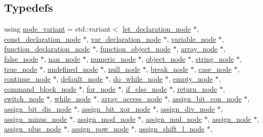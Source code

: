 \subsection*{Typedefs}
\begin{DoxyCompactItemize}
\item 
using \hyperlink{namespacejawe_aca98f97d61e437678e7478e2d8aaf41f}{node\+\_\+variant} = std\+::variant$<$ \hyperlink{classjawe_1_1let__declaration__node}{let\+\_\+declaration\+\_\+node} $\ast$, \hyperlink{classjawe_1_1const__declaration__node}{const\+\_\+declaration\+\_\+node} $\ast$, \hyperlink{classjawe_1_1var__declaration__node}{var\+\_\+declaration\+\_\+node} $\ast$, \hyperlink{classjawe_1_1variable__node}{variable\+\_\+node} $\ast$, \hyperlink{classjawe_1_1function__declaration__node}{function\+\_\+declaration\+\_\+node} $\ast$, \hyperlink{classjawe_1_1function__object__node}{function\+\_\+object\+\_\+node} $\ast$, \hyperlink{classjawe_1_1array__node}{array\+\_\+node} $\ast$, \hyperlink{classjawe_1_1false__node}{false\+\_\+node} $\ast$, \hyperlink{classjawe_1_1nan__node}{nan\+\_\+node} $\ast$, \hyperlink{classjawe_1_1numeric__node}{numeric\+\_\+node} $\ast$, \hyperlink{classjawe_1_1object__node}{object\+\_\+node} $\ast$, \hyperlink{classjawe_1_1string__node}{string\+\_\+node} $\ast$, \hyperlink{classjawe_1_1true__node}{true\+\_\+node} $\ast$, \hyperlink{classjawe_1_1undefined__node}{undefined\+\_\+node} $\ast$, \hyperlink{classjawe_1_1null__node}{null\+\_\+node} $\ast$, \hyperlink{classjawe_1_1break__node}{break\+\_\+node} $\ast$, \hyperlink{classjawe_1_1case__node}{case\+\_\+node} $\ast$, \hyperlink{classjawe_1_1continue__node}{continue\+\_\+node} $\ast$, \hyperlink{classjawe_1_1default__node}{default\+\_\+node} $\ast$, \hyperlink{classjawe_1_1do__while__node}{do\+\_\+while\+\_\+node} $\ast$, \hyperlink{classjawe_1_1empty__node}{empty\+\_\+node} $\ast$, \hyperlink{classjawe_1_1command__block__node}{command\+\_\+block\+\_\+node} $\ast$, \hyperlink{classjawe_1_1for__node}{for\+\_\+node} $\ast$, \hyperlink{classjawe_1_1if__else__node}{if\+\_\+else\+\_\+node} $\ast$, \hyperlink{classjawe_1_1return__node}{return\+\_\+node} $\ast$, \hyperlink{classjawe_1_1switch__node}{switch\+\_\+node} $\ast$, \hyperlink{classjawe_1_1while__node}{while\+\_\+node} $\ast$, \hyperlink{classjawe_1_1array__access__node}{array\+\_\+access\+\_\+node} $\ast$, \hyperlink{classjawe_1_1assign__bit__con__node}{assign\+\_\+bit\+\_\+con\+\_\+node} $\ast$, \hyperlink{classjawe_1_1assign__bit__dis__node}{assign\+\_\+bit\+\_\+dis\+\_\+node} $\ast$, \hyperlink{classjawe_1_1assign__bit__xor__node}{assign\+\_\+bit\+\_\+xor\+\_\+node} $\ast$, \hyperlink{classjawe_1_1assign__div__node}{assign\+\_\+div\+\_\+node} $\ast$, \hyperlink{classjawe_1_1assign__minus__node}{assign\+\_\+minus\+\_\+node} $\ast$, \hyperlink{classjawe_1_1assign__mod__node}{assign\+\_\+mod\+\_\+node} $\ast$, \hyperlink{classjawe_1_1assign__mul__node}{assign\+\_\+mul\+\_\+node} $\ast$, \hyperlink{classjawe_1_1assign__node}{assign\+\_\+node} $\ast$, \hyperlink{classjawe_1_1assign__plus__node}{assign\+\_\+plus\+\_\+node} $\ast$, \hyperlink{classjawe_1_1assign__pow__node}{assign\+\_\+pow\+\_\+node} $\ast$, \hyperlink{classjawe_1_1assign__shift__l__node}{assign\+\_\+shift\+\_\+l\+\_\+node} $\ast$, 
\end{DoxyCompactItemize}
